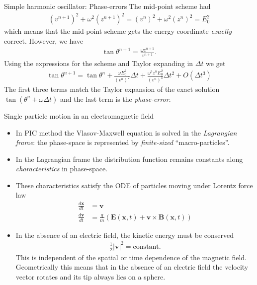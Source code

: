 \documentclass[pdf]{beamer}
\newcommand{\mvec}[1]{\mathbf{#1}}
\theoremstyle{definition}
\begin{document}
\begin{frame}{Simple harmonic oscillator: Phase-errors}
  \small%
  The mid-point scheme had
  \begin{align*}
    (v^{n+1})^2 + \omega^2 (z^{n+1})^2 = (v^{n})^2 + \omega^2 (z^{n})^2
    = E_0^2
  \end{align*}
  which means that the mid-point scheme gets the energy coordinate
  \emph{exactly} correct. However, we have
  \begin{align*}
    \tan\theta^{n+1} = \frac{\omega z^{n+1}}{v^{n+1}}.
  \end{align*}
  Using the expressions for the scheme and Taylor expanding in
  $\Delta t$ we get
  \begin{align*}
    \tan\theta^{n+1}
    =
    \tan\theta^n +
    \frac{\omega E_0^2}{(v^{n})^2}\Delta t +
    \frac{\omega^3 z^n E_0^2}{(v^n)^3}\Delta t^2
    + O(\Delta t^3)
  \end{align*}
  The first three terms match the Taylor expansion of the exact
  solution $\tan(\theta^n+\omega\Delta t)$ and the last term is the
  \emph{phase-error}.
\end{frame}

\begin{frame}{Single particle motion in an electromagnetic field}
  \small%
  \begin{itemize}
  \item In PIC method the Vlasov-Maxwell equation is solved in the
    \emph{Lagrangian frame}: the phase-space is represented by
    \emph{finite-sized} ``macro-particles''.
  \item In the Lagrangian frame the distribution
    function remains constants along \emph{characteristics} in
    phase-space.
  \item These characteristics satisfy the ODE of particles moving
    under Lorentz force law
    \begin{align*}
      \frac{d\mvec{x}}{dt} &= \mvec{v} \\
      \frac{d\mvec{v}}{dt} &= \frac{q}{m}(\mvec{E}(\mvec{x},t) + \mvec{v}\times\mvec{B}(\mvec{x},t))
    \end{align*}
  \item In the absence of an electric field, the kinetic energy must
    be conserved
    \begin{align*}
      \frac{1}{2} |\mvec{v}|^2 = \textrm{constant}.
    \end{align*}
    This is independent of the spatial or time dependence of the
    magnetic field. Geometrically this means that in the absence of an
    electric field the velocity vector rotates and its tip always lies
    on a sphere.
  \end{itemize}
\end{frame}
\end{document}
